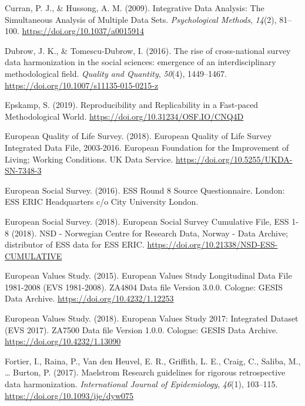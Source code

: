 \documentclass[12pt,]{article}
\begin{document}
\leavevmode\hypertarget{ref-Curran2009}{}%
Curran, P. J., \& Hussong, A. M. (2009). Integrative Data Analysis: The Simultaneous Analysis of Multiple Data Sets. \emph{Psychological Methods}, \emph{14}(2), 81--100. \url{https://doi.org/10.1037/a0015914}

\leavevmode\hypertarget{ref-Dubrow2016}{}%
Dubrow, J. K., \& Tomescu-Dubrow, I. (2016). The rise of cross-national survey data harmonization in the social sciences: emergence of an interdisciplinary methodological field. \emph{Quality and Quantity}, \emph{50}(4), 1449--1467. \url{https://doi.org/10.1007/s11135-015-0215-z}

\leavevmode\hypertarget{ref-Epskamp2019}{}%
Epskamp, S. (2019). Reproducibility and Replicability in a Fast-paced Methodological World. \url{https://doi.org/10.31234/OSF.IO/CNQ4D}

\leavevmode\hypertarget{ref-EQLS2018}{}%
European Quality of Life Survey. (2018). European Quality of Life Survey Integrated Data File, 2003-2016. European Foundation for the Improvement of Living; Working Conditions. UK Data Service. \url{https://doi.org/10.5255/UKDA-SN-7348-3}

\leavevmode\hypertarget{ref-ESS2016b}{}%
European Social Survey. (2016). ESS Round 8 Source Questionnaire. London: ESS ERIC Headquarters c/o City University London.

\leavevmode\hypertarget{ref-ESS2018}{}%
European Social Survey. (2018). European Social Survey Cumulative File, ESS 1-8 (2018). NSD - Norwegian Centre for Research Data, Norway - Data Archive; distributor of ESS data for ESS ERIC. \url{https://doi.org/10.21338/NSD-ESS-CUMULATIVE}

\leavevmode\hypertarget{ref-EVS2015}{}%
European Values Study. (2015). European Values Study Longitudinal Data File 1981-2008 (EVS 1981-2008). ZA4804 Data file Version 3.0.0. Cologne: GESIS Data Archive. \url{https://doi.org/10.4232/1.12253}

\leavevmode\hypertarget{ref-EVS2018}{}%
European Values Study. (2018). European Values Study 2017: Integrated Dataset (EVS 2017). ZA7500 Data file Version 1.0.0. Cologne: GESIS Data Archive. \url{https://doi.org/10.4232/1.13090}

\leavevmode\hypertarget{ref-Fortier2017a}{}%
Fortier, I., Raina, P., Van den Heuvel, E. R., Griffith, L. E., Craig, C., Saliba, M., \ldots{} Burton, P. (2017). Maelstrom Research guidelines for rigorous retrospective data harmonization. \emph{International Journal of Epidemiology}, \emph{46}(1), 103--115. \url{https://doi.org/10.1093/ije/dyw075}
\end{document}
